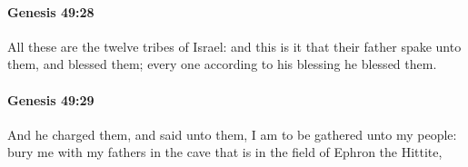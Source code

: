 		\paragraph{Genesis 49:28} %
			\label{GENESIS-49-28}

			All these are the twelve tribes of Israel: and this is it that their father spake unto them, and blessed them; every one according to his blessing he blessed them.


		\paragraph{Genesis 49:29} %
			\label{GENESIS-49-29}

			And he charged them, and said unto them, I am to be gathered unto my people: bury me with my fathers in the cave that is in the field of Ephron the Hittite,


